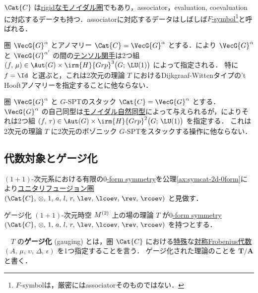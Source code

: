 \documentclass[TQFT_main]{subfiles}
\begin{document}
$\Cat{C}$ は\hyperref[redef:rigid]{rigidなモノイダル圏}でもあり，associator，evaluation, coevaluationに対応するデータも持つ．associatorに対応するデータはしばしば\hyperref[def:F-symbol]{$F$-symbol}\footnote{$F$-symbolは，厳密にはassociatorそのものではない．}と呼ばれる．

\begin{myexample}[label=ex:CGa]{圏 $\VecG{G}^\alpha$ とアノマリー}
    $\Cat{C} = \VecG{G}^\alpha$ とする．により
    $\VecG{G}^\alpha$ と $\VecG{G}^{\alpha'}$ の間の\hyperref[def:tensor-functor]{テンソル関手}は2つ組 $(f,\, \mu) \in \Aut (G) \times \irm{H}{Grp}^3 \bigl( G;\, \LU(1) \bigr)$ によって指定される．
    特に $f = \Id$ と選ぶと，これは2次元の理論 $T$ におけるDijkgraaf-Wittenタイプの't Hooftアノマリーを指定することに他ならない．
\end{myexample}

\begin{myexample}[label=ex:CGa]{圏 $\VecG{G}^\alpha$ と $G$-SPTのスタック}
    $\Cat{C} = \VecG{G}^\alpha$ とする．
    $\VecG{G}^\alpha$ の自己同型は\hyperref[def:tensor-functor]{モノイダル自然同型}によって与えられるが，によりそれは2つ組 $(f,\, \tau) \in \Aut (G) \times \irm{H}{Grp}^2 \bigl( G;\, \LU(1) \bigr)$ を指定する．
    これは2次元の理論 $T$ に2次元のボゾニック $G$-SPTをスタックする操作に他ならない．
\end{myexample}

\subsection{代数対象とゲージ化}

$(1+1)$-次元系における有限の\hyperref[def:p-form-sym]{$0$-form symmetry}を公理\ref{ax:symcat-2d-0form}により\hyperref[def:tensorfusion-cat]{ユニタリフュージョン圏} $(\Cat{C},\, \otimes,\, 1,\, a,\, l,\, r,\, \lev,\, \lcoev,\, \rev,\, \rcoev)$ と見做す．

\begin{mydefph}[label=def:gauging]{ゲージ化}
    $(1+1)$-次元時空 $M^{(2)}$ 上の場の理論 $T$ が\hyperref[def:p-form-sym]{$0$-form symmetry} $(\Cat{C},\, \otimes,\, 1,\, a,\, l,\, r,\, \lev,\, \lcoev,\, \rev,\, \rcoev)$ を持つとする．

    　$T$ の\textbf{ゲージ化} (gauging) とは，圏 $\Cat{C}$ における\hyperref[def:special-Frobenius]{特殊}な\hyperref[def:sym-Frobenius]{対称Frobenius代数} $(A,\, \mu,\, \upsilon,\, \Delta,\, \epsilon)$ を1つ指定することを言う．
    ゲージ化された理論のことを $\bm{T/A}$ と書く．
\end{mydefph}
\end{document}
